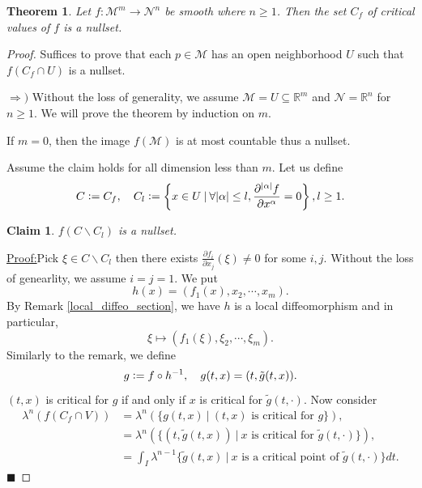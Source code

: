 \documentclass[10pt]{article}
\newtheorem{theorem}{Theorem} [section]
\newtheorem{claim}{Claim}
\newenvironment{claimproof}[1]{\par\noindent\underline{Proof:}\space#1}{\hfill $\blacksquare$}
\newcommand{\defeq}{\vcentcolon=}
\newcommand{\R}[0]{\mathbb{R}}
\newcommand{\M}[0]{\mathcal{M}}
\newcommand{\maniN}[0]{\mathcal{N}}
\newcommand{\sep}[0]{\:|\:}
\newcommand{\pd}[2]{{\frac {\partial #1} {\partial #2}}}
\begin{document}
\setcounter{claim}{0}
\begin{theorem}
  Let $f:\M^m\to\maniN^n$ be smooth where $n\geq 1$. Then the set $C_f$ of critical values of $f$ is a nullset. 
\end{theorem}
\begin{proof}
  Suffices to prove that each $p\in\M$ has an open neighborhood $U$ such that $f(C_f\cap U)$ is a nullset.
  \par$\Rightarrow)$ Without the loss of generality, we assume $\M=U\subseteq\R^m$ and $\maniN=\R^n$ for $n\geq 1$. We will prove the theorem by induction on $m$. 
  \par If $m=0$, then the image $f(\M)$ is at most countable thus a nullset.
  \par Assume the claim holds for all dimension less than $m$. Let us define 
  \begin{equation*}
    C\defeq C_f,\quad C_l\defeq \left\{x\in U\sep\forall \vert\alpha\vert\leq l, {\frac {\partial^{\vert\alpha\vert}f} {\partial x^\alpha}}=0\right\},l\geq 1.
  \end{equation*}
  \begin{claim}
    $f(C\backslash C_l)$ is a nullset.
  \end{claim}
  \begin{claimproof}
    Pick $\xi\in C\backslash C_l$ then there exists $\pd{f_i}{x_j}(\xi) \not=0$ for some $i,j$. Without the loss of genearlity, we assume $i=j=1$.
  We put 
  \begin{equation*}
    h(x) = (f_1(x),x_2,\cdots,x_m).
  \end{equation*}
   By Remark \ref{local_diffeo_section}, we have $h$ is a local diffeomorphism and in particular,
   \begin{equation*}
    \xi\mapsto(f_1(\xi),\xi_2,\cdots,\xi_m).
   \end{equation*}
   Similarly to the remark, we define 
   \begin{equation*}
    g\defeq f\circ h^{-1},\quad g(t,x) = (t,\tilde{g}(t,x)).
   \end{equation*}
   $(t,x)$ is critical for $g$ if and only if $x$ is critical for $\tilde{g}(t,\cdot)$. Now consider 
   \begin{align*}
    \lambda^n(f(C_f\cap V)) & = \lambda^n(\{g(t,x)\sep\text{$(t,x)$ is critical for $g$}\}),\\
    & = \lambda^n(\{(t,\tilde{g}(t,x))\sep\text{$x$ is critical for $\tilde{g}(t,\cdot)$}\}),\\
    & = \int_I \lambda^{n-1}\{\tilde{g}(t,x)\sep\text{$x$ is a critical point of $\tilde{g}(t,\cdot)$}\}dt.

\end{align*}
\end{claimproof}
\end{proof}
\end{document}
